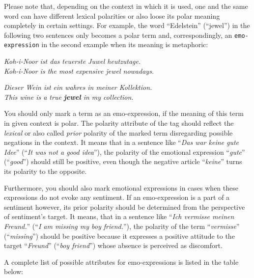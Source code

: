 \documentclass[11pt,a4paper]{article}
\newenvironment{example}{\begin{center}\begin{exe}\ex}{\end{exe}\end{center}}
\renewenvironment{example}{\begin{center}\itshape}{\upshape\end{center}}
\begin{document}
Please note that, depending on the context in which it is used, one
and the same word can have different lexical polarities or also loose
its polar meaning completely in certain settings.  For example, the
word ``Edelstein'' (``jewel'') in the following two sentences only
becomes a polar term and, correspondingly, an \texttt{emo-expression}
in the second example when its meaning is metaphoric:
\begin{example}
  \textit{Koh-i-Noor ist das teuerste Juwel heutzutage.}\\
  \textit{Koh-i-Noor is the most expensive jewel nowadays.}
\end{example}
\begin{example}
  \textit{Dieser Wein ist ein wahres  in meiner Kollektion.}\\
  \textit{This wine is a true \textbf{jewel} in my collection.}
\end{example}

You should only mark a term as an emo-expression, if the meaning of
this term in given context is polar.  The polarity attribute of the
tag should reflect the \textit{lexical} or also called \textit{prior}
polarity of the marked term disregarding possible negations in the
context.  It means that in a sentence like ``\textit{Das war keine
  gute Idee}'' (``\textit{It was not a good idea}''), the polarity of
the emotional expression ``\textit{gute}'' (``\textit{good}'') should
still be positive, even though the negative article ``\textit{keine}''
turns its polarity to the opposite.

Furthermore, you should also mark emotional expressions in cases when
these expressions do not evoke any sentiment.  If an emo-expression is
a part of a sentiment however, its prior polarity should be determined
from the perspective of sentiment's target.  It means, that in a
sentence like ``\textit{Ich vermisse meinen Freund.}''  (``\textit{I
  am missing my boy friend.}''), the polarity of the term
``\textit{vermisse}'' (``\textit{missing}'') should be positive
because it expresses a positive attitude to the target
``\textit{Freund}'' (``\textit{boy friend}'') whose absence is
perceived as discomfort.

A complete list of possible attributes for emo-expressions is listed
in the table below:
\end{document}
